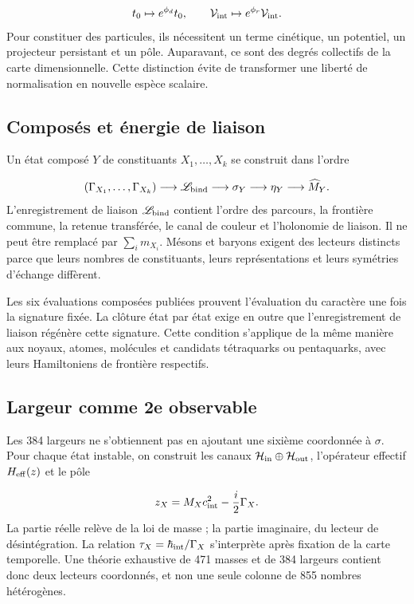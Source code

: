 \[
t_0\mapsto e^{\phi_d}t_0,
\qquad
\mathcal V_{\rm int}\mapsto e^{\phi_r}\mathcal V_{\rm int}.
\]
Pour constituer des particules, ils nécessitent un terme cinétique, un potentiel, un projecteur persistant et un pôle. Auparavant, ce sont des degrés collectifs de la carte dimensionnelle. Cette distinction évite de transformer une liberté de normalisation en nouvelle espèce scalaire.

\subsection{Composés et énergie de liaison}
Un état composé \(Y\) de constituants \(X_1,\ldots,X_k\) se construit dans l'ordre

\[
(\Gamma_{X_1},\ldots,\Gamma_{X_k})
\longrightarrow
\mathscr L_{\rm bind}
\longrightarrow
\sigma_Y
\longrightarrow
\eta_Y
\longrightarrow
\widehat M_Y.
\]
L'enregistrement de liaison \(\mathscr L_{\rm bind}\) contient l'ordre des parcours, la frontière commune, la retenue transférée, le canal de couleur et l'holonomie de liaison. Il ne peut être remplacé par \(\sum_i m_{X_i}\). Mésons et baryons exigent des lecteurs distincts parce que leurs nombres de constituants, leurs représentations et leurs symétries d'échange diffèrent.

Les six évaluations composées publiées prouvent l'évaluation du caractère une fois la signature fixée. La clôture état par état exige en outre que l'enregistrement de liaison régénère cette signature. Cette condition s'applique de la même manière aux noyaux, atomes, molécules et candidats tétraquarks ou pentaquarks, avec leurs Hamiltoniens de frontière respectifs.

\subsection{Largeur comme 2e observable}
Les 384 largeurs ne s'obtiennent pas en ajoutant une sixième coordonnée à \(\sigma\). Pour chaque état instable, on construit les canaux \(\mathcal H_{\rm in}\oplus\mathcal H_{\rm out}\), l'opérateur effectif \(H_{\rm eff}(z)\) et le pôle

\[
z_X=M_Xc_{\rm int}^{2}-\frac{i}{2}\Gamma_X.
\]
La partie réelle relève de la loi de masse ; la partie imaginaire, du lecteur de désintégration. La relation \(\tau_X=\hbar_{\rm int}/\Gamma_X\) s'interprète après fixation de la carte temporelle. Une théorie exhaustive de 471 masses et de 384 largeurs contient donc deux lecteurs coordonnés, et non une seule colonne de 855 nombres hétérogènes.

